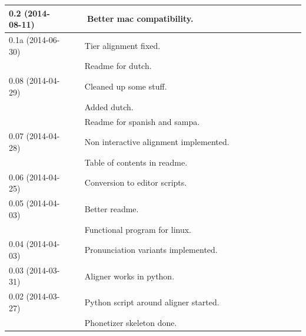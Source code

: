 \documentclass[twoside,a4paper]{book}
\newcommand{\tabitem}{~~\llap{\textbullet}~~}
\begin{document}
\begin{table}[H]
\begin{tabular}{|p{0.2\linewidth}p{0.8\linewidth}|}
		\hline
		0.2 (2014-08-11) & \tabitem Better mac compatibility.\\
		\hline
		0.1a (2014-06-30) & \tabitem Tier alignment fixed.\\
			& \tabitem Readme for dutch.\\
		\hline
		0.08 (2014-04-29) & \tabitem Cleaned up some stuff.\\
			& \tabitem Added dutch.\\
			& \tabitem Readme for spanish and sampa.\\
		\hline
		0.07 (2014-04-28) & \tabitem Non interactive alignment implemented.\\
			& \tabitem Table of contents in readme.\\
		\hline
		0.06 (2014-04-25) & \tabitem Conversion to editor scripts.\\
		\hline
		0.05 (2014-04-03) & \tabitem Better readme.\\
			& \tabitem Functional program for linux.\\
		\hline
		0.04 (2014-04-03) & \tabitem Pronunciation variants implemented.\\
		\hline
		0.03 (2014-03-31) & \tabitem Aligner works in python.\\
		\hline
		0.02 (2014-03-27) & \tabitem Python script around aligner started.\\
			& \tabitem Phonetizer skeleton done.\\
		\hline
	\end{tabular}
\end{table}
\end{document}
